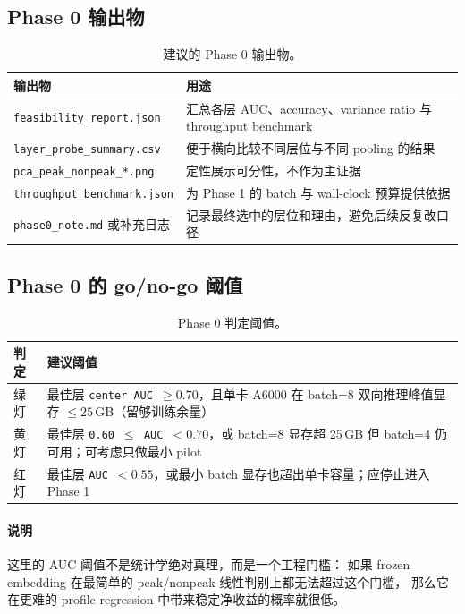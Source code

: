 \documentclass[11pt,a4paper]{ctexart}
\begin{document}
\subsection{Phase 0 输出物}

\begin{table}[H]
\centering
\small
\caption{建议的 Phase 0 输出物。}
\label{tab:phase0_outputs}
\begin{tabularx}{\textwidth}{l Y}
\toprule
输出物 & 用途 \\
\midrule
\texttt{feasibility\_report.json} & 汇总各层 AUC、accuracy、variance ratio 与 throughput benchmark \\
\texttt{layer\_probe\_summary.csv} & 便于横向比较不同层位与不同 pooling 的结果 \\
\texttt{pca\_peak\_nonpeak\_*.png} & 定性展示可分性，不作为主证据 \\
\texttt{throughput\_benchmark.json} & 为 Phase 1 的 batch 与 wall-clock 预算提供依据 \\
\texttt{phase0\_note.md} 或补充日志 & 记录最终选中的层位和理由，避免后续反复改口径 \\
\bottomrule
\end{tabularx}
\end{table}

\subsection{Phase 0 的 go/no-go 阈值}

\begin{table}[H]
\centering
\small
\caption{Phase 0 判定阈值。}
\label{tab:phase0_thresholds}
\begin{tabularx}{\textwidth}{l Y}
\toprule
判定 & 建议阈值 \\
\midrule
绿灯 & 最佳层 \texttt{center AUC $\ge 0.70$}，且单卡 A6000 在 batch=8 双向推理峰值显存 $\le 25$\,GB（留够训练余量） \\
黄灯 & 最佳层 \texttt{0.60 $\le$ AUC $< 0.70$}，或 batch=8 显存超 25\,GB 但 batch=4 仍可用；可考虑只做最小 pilot \\
红灯 & 最佳层 \texttt{AUC $< 0.55$}，或最小 batch 显存也超出单卡容量；应停止进入 Phase 1 \\
\bottomrule
\end{tabularx}
\end{table}

\paragraph{说明}
这里的 AUC 阈值不是统计学绝对真理，而是一个工程门槛：
如果 frozen embedding 在最简单的 peak/nonpeak 线性判别上都无法超过这个门槛，
那么它在更难的 profile regression 中带来稳定净收益的概率就很低。
\end{document}
